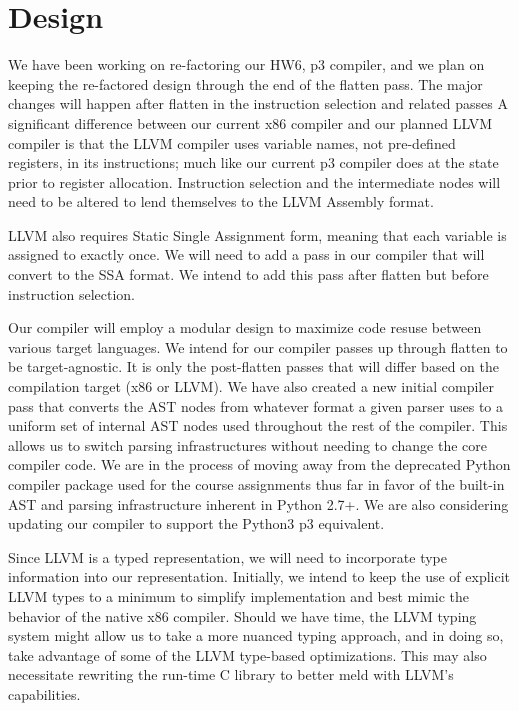 \documentclass[11pt]{article}
\begin{document}
\section{Design}

We have been working on re-factoring our HW6, p3 compiler,
and we plan on keeping
the re-factored design through the end of the flatten pass. The major
changes will happen after flatten in the instruction selection and related passes
A significant difference between our current x86
compiler and our planned LLVM compiler is that the LLVM compiler
uses variable names, not pre-defined registers, in its instructions;
much like our current p3
compiler does at the state prior to register allocation. Instruction
selection and the intermediate nodes will need to be altered to lend
themselves to the LLVM Assembly format.

LLVM also requires Static Single Assignment form,
meaning that each variable is assigned to exactly once.
We will need to add a pass in our compiler that will convert to the
SSA format. We
intend to add this pass after flatten but before instruction
selection.

Our compiler will employ a modular design to maximize code resuse between
various target languages. 
We intend for our compiler passes up through flatten to be
target-agnostic. It is only the post-flatten passes that will differ
based on the compilation target (x86 or LLVM). We have also created a
new initial compiler pass that converts the AST nodes from whatever
format a given parser uses to a uniform set of internal AST nodes used throughout
the rest of the compiler. This allows us to switch parsing
infrastructures without needing to change the core compiler code. We are
in the process of moving away from the deprecated Python compiler package used
for the course assignments thus far in
favor of the built-in AST and parsing infrastructure inherent in Python
2.7+. We are also considering updating our compiler to support the
Python3 p3 equivalent.

Since LLVM is a typed representation, we will need to incorporate
type information into our representation. Initially, we intend to keep
the use of explicit LLVM types to a minimum to simplify implementation
and best mimic the behavior of the native x86 compiler. Should we have
time, the LLVM typing system might allow us to take a more nuanced
typing approach, and in doing so, take advantage of some of the LLVM
type-based optimizations. This may also necessitate rewriting the run-time
C library to better meld with LLVM's capabilities.
\end{document}
